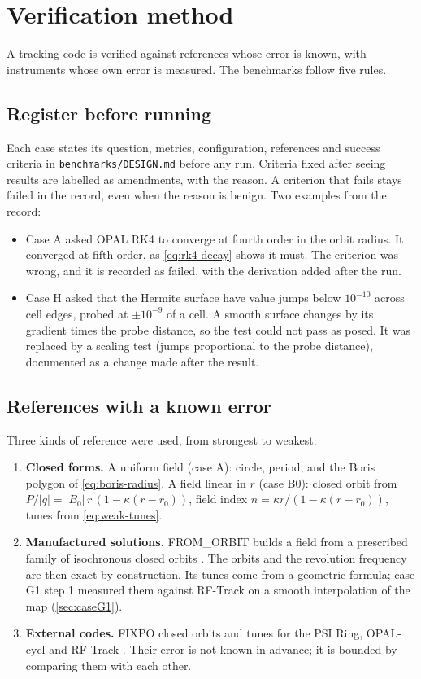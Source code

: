 \chapter{Verification method}\label{ch:method}

A tracking code is verified against references whose error is known, with instruments whose own error is measured.
The benchmarks follow five rules.

\section{Register before running}
Each case states its question, metrics, configuration, references and success criteria in \nolinkurl{benchmarks/DESIGN.md}
before any run.
Criteria fixed after seeing results are labelled as amendments, with the reason.
A criterion that fails stays failed in the record, even when the reason is benign.
Two examples from the record:
\begin{itemize}
\item Case A asked OPAL RK4 to converge at fourth order in the orbit radius.
It converged at fifth order, as \cref{eq:rk4-decay} shows it must.
The criterion was wrong, and it is recorded as failed, with the derivation added after the run.
\item Case H asked that the Hermite surface have value jumps below $10^{-10}$ across cell edges, probed at $\pm10^{-9}$ of a
cell.
A smooth surface changes by its gradient times the probe distance, so the test could not pass as posed.
It was replaced by a scaling test (jumps proportional to the probe distance), documented as a change made after the
result.
\end{itemize}

\section{References with a known error}
Three kinds of reference were used, from strongest to weakest:
\begin{enumerate}
\item \textbf{Closed forms.}
A uniform field (case A): circle, period, and the Boris polygon of \cref{eq:boris-radius}.
A field linear in $r$ (case B0): closed orbit from $P/|q| = |B_0|\,r\,(1-\kappa(r-r_0))$, field index $n = \kappa r/(1-\kappa(r-r_0))$,
tunes from \cref{eq:weak-tunes}.
\item \textbf{Manufactured solutions.}
FROM\_ORBIT builds a field from a prescribed family of isochronous closed orbits \cite{planche2019,planche2023}.
The orbits and the revolution frequency are then exact by construction.
Its tunes come from a geometric formula; case G1 step 1 measured them against RF-Track on a smooth interpolation of the
map (\cref{sec:caseG1}).
\item \textbf{External codes.}
FIXPO closed orbits and tunes for the PSI Ring, OPAL-cycl \cite{adelmann2019} and RF-Track
\cite{latina2023}.
Their error is not known in advance; it is bounded by comparing them with each other.
\end{enumerate}


